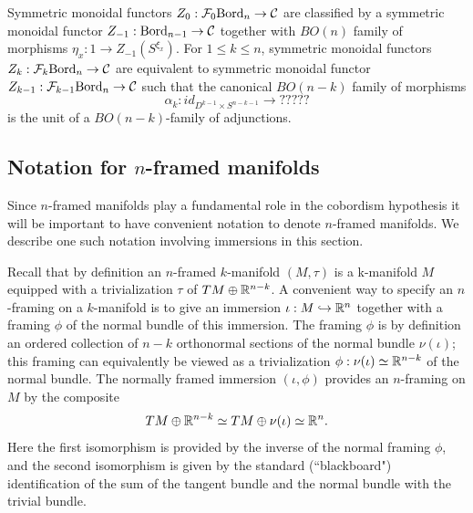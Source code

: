 \documentclass{amsart}
\begin{document}
\begin{theorem}
	Symmetric monoidal functors $Z_0: \mathcal F_{0}\mathrm{Bord}_n \to \mathcal C$ are classified by a symmetric monoidal functor $Z_{-1}:\mathrm{Bord}_{n-1} \to \mathcal C$ together with $BO(n)$ family of morphisms $\eta_x: 1 \to Z_{-1}(S^{\xi_x})$. For $1 \leq k \leq n$, symmetric monoidal functors $Z_k: \mathcal F_{k}\mathrm{Bord}_n \to \mathcal C$ are equivalent to symmetric monoidal functor $Z_{k-1}: \mathcal F_{k-1}\mathrm{Bord}_n \to \mathcal C $ such that the canonical $BO(n-k)$ family of morphisms 
	\begin{equation*}
		\alpha_k: id_{D^{k-1} \times S^{n-k -1}} \to ?????
	\end{equation*}
	is the unit of a $BO(n-k)$-family of adjunctions. 
\end{theorem}




\subsection{Notation for $n$-framed manifolds} 

Since $n$-framed manifolds play a fundamental role in the cobordism hypothesis it will be important to have convenient notation to denote $n$-framed manifolds.  We describe one such notation involving immersions in this section.

Recall that by definition an $n$-framed $k$-manifold $(M,\tau)$ is a k-manifold $M$ equipped with a trivialization $\tau$ of $TM \oplus \mathbb R^{n-k}$.  A convenient way to specify an $n$-framing on a $k$-manifold is to give an immersion $\iota: M \hookrightarrow \mathbb R^n$ together with a framing $\phi$ of the normal bundle of this immersion.  The framing $\phi$ is by definition an ordered collection of $n-k$ orthonormal sections of the normal bundle $\nu(\iota)$; this framing can equivalently be viewed as a trivialization $\phi: \nu(\iota) \simeq \mathbb R^{n-k}$ of the normal bundle.  The normally framed immersion $(\iota, \phi)$ provides an $n$-framing on $M$ by the composite
\[TM \oplus \mathbb R^{n-k} \simeq TM \oplus \nu(\iota) \simeq  \mathbb R^n.\]
Here the first isomorphism is provided by the inverse of the normal framing $\phi$, and the second isomorphism is given by the standard (``blackboard") identification of the sum of the tangent bundle and the normal bundle with the trivial bundle.
\end{document}
